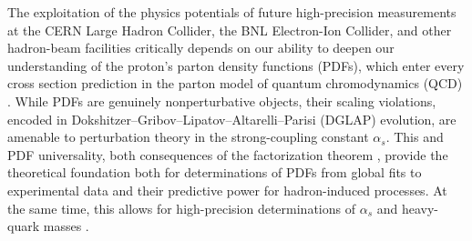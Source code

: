 \documentclass[
 twocolumn,
 superscriptaddress,
 preprintnumbers,
 nofootinbib,
 amsmath,amssymb,
 aps,
 prl
 ]{revtex4-2}
\begin{document}
The exploitation of the physics potentials of future high-precision measurements at the CERN Large Hadron Collider, the BNL Electron-Ion Collider, and other hadron-beam facilities critically depends on our ability to deepen our understanding of the proton's parton density functions (PDFs), which enter every cross section prediction in the parton model \cite{Bjorken:1969ja} of quantum chromodynamics (QCD) \cite{Fritzsch:1973pi}.
While PDFs are genuinely nonperturbative objects, their scaling violations, encoded in Dokshitzer--Gribov--Lipatov--Altarelli--Parisi (DGLAP) \cite{Gribov:1972ri,Gribov:1972rt,Altarelli:1977zs,Dokshitzer:1977sg} evolution, are amenable to perturbation theory in the strong-coupling constant $\alpha_s$.
This and PDF universality, both consequences of the factorization theorem \cite{Collins:1989gx}, provide the theoretical foundation both for determinations of PDFs from global fits to experimental data and their predictive power for hadron-induced processes.
At the same time, this allows for high-precision determinations of $\alpha_s$ \cite{Alekhin:2025qdj} and heavy-quark masses \cite{Alekhin:2010sv,Alekhin:2012un}.
\end{document}

